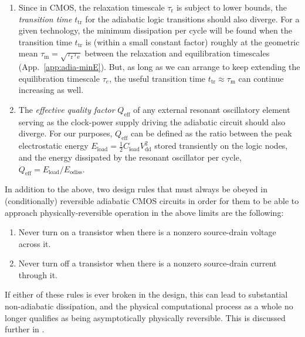 \documentclass[preprints,article,accept,moreauthors,pdftex]{Definitions/mdpi}
\begin{document}
\begin{paracol}{2}
\begin{enumerate}
    \item Since in CMOS, the relaxation timescale $\tau_\mathrm{r}$ is subject to lower bounds, the \emph{transition time} $t_\mathrm{tr}$ for the adiabatic logic transitions should also diverge. For a given technology, the minimum dissipation per cycle will be found when the transition time $t_\mathrm{tr}$ is (within a small constant factor) roughly at the geometric mean $\tau_\mathrm{m} = \sqrt{\tau_\mathrm{r}\tau_\mathrm{e}}$ between the relaxation and equilibration timescales (App.~\ref{app:adia-minE}). 
    But, as long as we can arrange to keep extending the equilibration timescale $\tau_e$, the useful transition time $t_\mathrm{tr} \approx \tau_\mathrm{m}$ can continue increasing as well.
    
    \item The \emph{effective quality factor} $Q_\mathrm{eff}$ of any external resonant oscillatory element serving as the clock-power supply driving the adiabatic circuit should also diverge. For our purposes, $Q_\mathrm{eff}$ can be defined as the ratio between the peak electrostatic energy $E_\mathrm{load}=\frac{1}{2}C_\mathrm{load}V_\mathrm{dd}^2$ stored transiently on the logic nodes, and the energy dissipated by the resonant oscillator per cycle, $Q_\mathrm{eff} = E_\mathrm{load}/E_\mathrm{odiss}$.
    
\end{enumerate}

In addition to the above, two design rules that must always be obeyed in (conditionally) reversible adiabatic CMOS circuits in order for them to be able to approach physically-reversible operation in the above limits are the following:

\begin{enumerate}
    \item Never turn on a transistor when there is a nonzero source-drain voltage across it.
    \item Never turn off a transistor when there is a nonzero source-drain current through it.
\end{enumerate}

If either of these rules is ever broken in the design, this can lead to substantial non-adiabatic dissipation, and the physical computational process as a whole no longer qualifies as being asymptotically physically reversible. This is discussed further in \cite{Fra+20b,Fra03,Fra99}.


\end{paracol}
\end{document}
